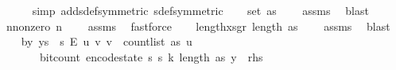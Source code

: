 \begin{isabellebody}
\ \ \ \ \isamarkupfalse%
\ {\isacharparenleft}{\kern0pt}simp\ add{\isacharcolon}{\kern0pt}sdef{\isacharbrackleft}{\kern0pt}symmetric{\isacharbrackright}{\kern0pt}\ sdef{\isacharbrackleft}{\kern0pt}symmetric{\isacharbrackright}{\kern0pt}{\isacharparenright}{\kern0pt}\isanewline
\isanewline
\ \ \isamarkupfalse%
\ {\isachardoublequoteopen}set\ as\ {\isasymnoteq}\ {\isacharbraceleft}{\kern0pt}{\isacharbraceright}{\kern0pt}{\isachardoublequoteclose}\ \isamarkupfalse%
\ assms\ \isamarkupfalse%
\ blast\isanewline
\ \ \isamarkupfalse%
\ n{\isacharunderscore}{\kern0pt}nonzero{\isacharcolon}{\kern0pt}\ {\isachardoublequoteopen}n\ {\isachargreater}{\kern0pt}\ {}{\isachardoublequoteclose}\ \isamarkupfalse%
\ assms{\isacharparenleft}{\kern0pt}{}{\isacharparenright}{\kern0pt}\ \isamarkupfalse%
\ fastforce\isanewline
\ \ \isamarkupfalse%
\ length{\isacharunderscore}{\kern0pt}xs{\isacharunderscore}{\kern0pt}gr{\isacharunderscore}{\kern0pt}{}{\isacharcolon}{\kern0pt}\ {\isachardoublequoteopen}length\ as\ {\isachargreater}{\kern0pt}\ {}{\isachardoublequoteclose}\ \isamarkupfalse%
\ assms{\isacharparenleft}{\kern0pt}{}{\isacharparenright}{\kern0pt}\ \isamarkupfalse%
\ blast\isanewline
\isanewline
\ \ \isamarkupfalse%
\ b{\isacharcolon}{\kern0pt}{\isachardoublequoteopen}{\isasymAnd}y{\isachardot}{\kern0pt}\ y{\isasymin}{\isacharbraceleft}{\kern0pt}{}{\isachardot}{\kern0pt}{\isachardot}{\kern0pt}{\isacharless}{\kern0pt}s\ {\isasymtimes}\ {\isacharbraceleft}{\kern0pt}{}{\isachardot}{\kern0pt}{\isachardot}{\kern0pt}{\isacharless}{\kern0pt}s\ {\isasymrightarrow}\isactrlsub E\ {\isacharbraceleft}{\kern0pt}{\isacharparenleft}{\kern0pt}u{\isacharcomma}{\kern0pt}\ v{\isacharparenright}{\kern0pt}{\isachardot}{\kern0pt}\ v\ {\isacharless}{\kern0pt}\ count{\isacharunderscore}{\kern0pt}list\ as\ u{\isacharbraceright}{\kern0pt}\ {\isasymLongrightarrow}\isanewline
\ \ \ \ \ \ \ bit{\isacharunderscore}{\kern0pt}count\ {\isacharparenleft}{\kern0pt}encode{\isacharunderscore}{\kern0pt}state\ {\isacharparenleft}{\kern0pt}s\ s\ k{\isacharcomma}{\kern0pt}\ length\ as{\isacharcomma}{\kern0pt}\ y{\isacharparenright}{\kern0pt}{\isacharparenright}{\kern0pt}\ {\isasymle}\ {\isacharquery}{\kern0pt}rhs{\isachardoublequoteclose}\isanewline

\end{isabellebody}
